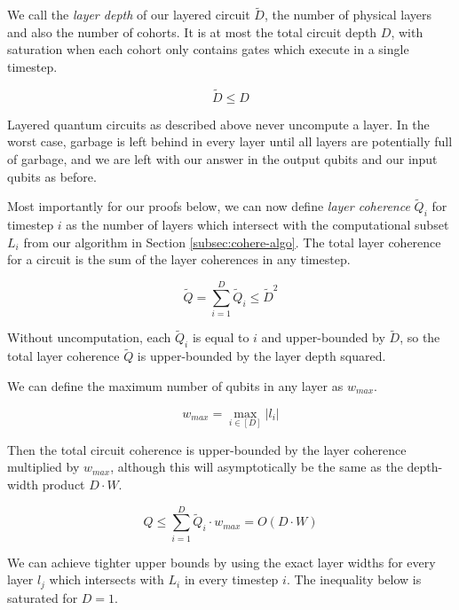 We call the \emph{layer depth} of our layered circuit $\tilde{D}$, the number
of physical layers and also the number of cohorts.
It is at most the total circuit depth $D$, with saturation when each cohort
only contains gates which execute in a single timestep.

\begin{equation}
\tilde{D} \le D
\end{equation}

Layered quantum circuits as described above never uncompute
a layer. In the worst case, garbage is left behind in every
layer until all layers are potentially full of garbage,
and we are left with our answer in the output qubits and
our input qubits as before.

Most importantly for our proofs below, we can now define
\emph{layer coherence} $\tilde{Q}_i$  for timestep $i$
as the number of layers which intersect with the computational
subset $L_i$ from our algorithm in Section \ref{subsec:cohere-algo}.
The total layer coherence for a circuit is the sum of the
layer coherences in any timestep.

\begin{equation}
\tilde{Q} = \sum_{i=1}^{D} \tilde{Q}_i \le \tilde{D}^2
\end{equation}

Without uncomputation, each $\tilde{Q}_i$ is equal to $i$ and upper-bounded by $\tilde{D}$,
so the total layer coherence $\tilde{Q}$ is upper-bounded by the layer depth squared.

We can define the maximum number of qubits in any layer as $w_{max}$.

\begin{equation}
w_{max} = \max_{i \in [D]} |l_i|
\end{equation}

Then the total circuit coherence is upper-bounded by the layer coherence
multiplied by $w_{max}$, although this will asymptotically be the same as the depth-width product $D\cdot W$.

\begin{equation}
Q \le \sum_{i=1}^{D} \tilde{Q}_i \cdot w_{max} = O(D\cdot W)
\end{equation}

We can achieve tighter upper bounds by using the exact layer widths for every
layer $l_j$ which intersects with $L_i$ in every timestep $i$.
The inequality below is saturated for $D=1$.

